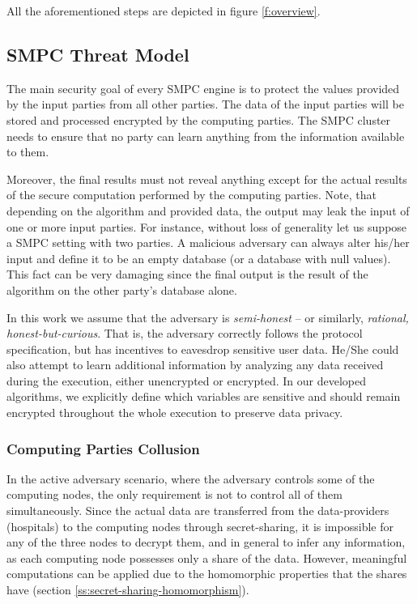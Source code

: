 All the aforementioned steps are depicted in figure \ref{f:overview}.




\subsection{SMPC Threat Model}\label{s:smpc-threat-model}
The main security goal of every SMPC engine is to protect the values provided by the input parties from all other parties.
The data of the input parties will be stored and processed encrypted by the computing parties.
The SMPC cluster needs to ensure that no party can learn anything from the information available to them.

Moreover, the final results must not reveal anything except for the actual results of the secure computation performed by the computing parties.
Note, that depending on the algorithm and provided data, the output may leak the input of one or more input parties.
For instance, without loss of generality let us suppose a SMPC setting with two parties.
A malicious adversary can always alter his/her input and define it to be an empty database (or a database with null values).
This fact can be very damaging since the final output is the result of the algorithm on the other party’s database alone.

In this work we assume that the adversary is \emph{semi\hyp honest} -- or similarly, \emph{rational, honest\hyp but\hyp curious}.
That is, the adversary correctly follows the protocol specification, but has incentives to eavesdrop sensitive user data.
He/She could also attempt to learn additional information by analyzing any data received during the execution, either unencrypted or encrypted.
In our developed algorithms, we explicitly define which variables are sensitive and should remain encrypted throughout the whole execution to preserve data privacy.


\subsubsection{Computing Parties Collusion}\label{s:computing-parties-collusion}
In the active adversary scenario, where the adversary controls some of the computing nodes, the only requirement is not to control all of them simultaneously.
Since the actual data are transferred from the data-providers (hospitals) to the computing nodes through secret\hyp sharing, it is impossible for any of the three nodes to decrypt them, and in general to infer any information, as each computing node possesses only a share of the data.
However, meaningful computations can be applied due to the homomorphic properties that the shares have (section \ref{ss:secret-sharing-homomorphism}).

